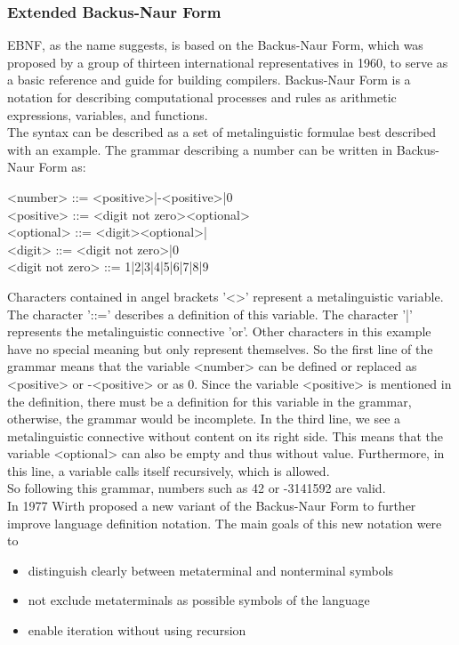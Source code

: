 \subsubsection{Extended Backus-Naur Form}\label{sec:EBNF}
\ac{EBNF}, as the name suggests, is based on the Backus-Naur Form, which was proposed by a group of thirteen international representatives in 1960, to serve as a basic reference and guide for building compilers. Backus-Naur Form is a notation for describing computational processes and rules as arithmetic expressions, variables, and functions. \parencite[cf.][p. 300]{backus_report_1960}\\
The syntax can be described as a set of metalinguistic formulae best described with an example. The grammar describing a number can be written in Backus-Naur Form as:
\begin{grammar}
    <number> ::= <positive>|-<positive>|0 \\
    <positive> ::= <digit not zero><optional> \\
    <optional> ::= <digit><optional>| \\
    <digit> ::= <digit not zero>|0 \\
    <digit not zero> ::= 1|2|3|4|5|6|7|8|9
\end{grammar}
Characters contained in angel brackets '<>' represent a metalinguistic variable. The character '::=' describes a definition of this variable. The character '|' represents the metalinguistic connective 'or'. Other characters in this example have no special meaning but only represent themselves. So the first line of the grammar means that the variable <number> can be defined or replaced as <positive> or -<positive> or as 0. Since the variable <positive> is mentioned in the definition, there must be a definition for this variable in the grammar, otherwise, the grammar would be incomplete. In the third line, we see a metalinguistic connective without content on its right side. This means that the variable <optional> can also be empty and thus without value. Furthermore, in this line, a variable calls itself recursively, which is allowed. \parencite[cf.][pp. 301-303]{backus_report_1960}\\
So following this grammar, numbers such as 42 or -3141592 are valid.\\
In 1977 Wirth proposed a new variant of the Backus-Naur Form to further improve language definition notation. The main goals of this new notation were to \parencite[cf.][p. 822]{wirth_what_1977}
\begin{itemize}[noitemsep]
    \item distinguish clearly between metaterminal and nonterminal symbols
    \item not exclude metaterminals as possible symbols of the language
    \item enable iteration without using recursion
\end{itemize}
